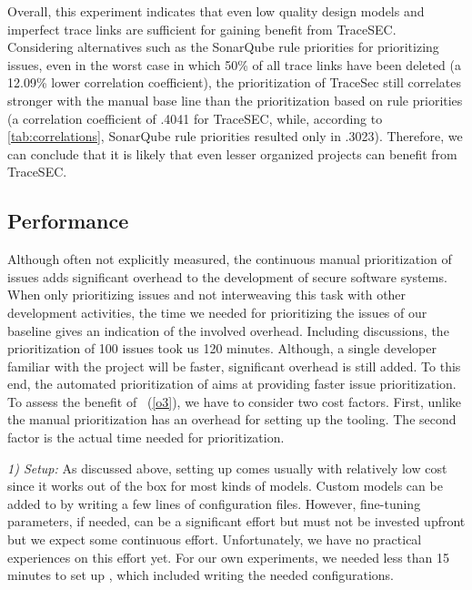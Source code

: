 Overall, this experiment indicates that even low quality design models and imperfect trace links are sufficient for gaining benefit from TraceSEC.
Considering alternatives such as the SonarQube rule priorities for prioritizing issues, even in the worst case in which 50\% of all trace links have been deleted (a 12.09\% lower correlation coefficient), the prioritization of TraceSec still correlates stronger with the manual base line than the prioritization based on rule priorities (a correlation coefficient of .4041 for TraceSEC, while, according to \autoref{tab:correlations}, SonarQube rule priorities resulted only in .3023).
Therefore, we can conclude that it is likely that even lesser organized projects can benefit from TraceSEC.

\subsection{Performance}
%
	Although often not explicitly measured, the continuous manual prioritization of issues adds significant overhead to the development of secure software systems.
	When only prioritizing issues and not interweaving this task with other development activities, the time we needed for prioritizing the issues of our baseline gives an indication of the involved overhead.
	Including discussions, the prioritization of 100 issues took us 120 minutes.
	Although, a single developer familiar with the project will be faster, significant overhead is still added.
	To this end, the automated prioritization of \appr{} aims at providing faster issue prioritization.
	To assess the benefit of \appr{}~(\ref{o3}), we have to consider two cost factors.
	First, unlike the manual prioritization \appr{} has an overhead for setting up the tooling.
	The second factor is the actual time needed for prioritization.




	\textit{1) Setup:}
	As discussed above, setting up \appr{} comes usually with relatively low cost since it works out of the box for most kinds of models.
	Custom models can be added to \appr{} by writing a few lines of configuration files.
	However, fine-tuning parameters, if needed, can be a significant effort but must not be invested upfront but we expect some continuous effort.
	Unfortunately, we have no practical experiences on this effort yet.
	For our own experiments, we needed less than 15 minutes to set up \appr{}, which included writing the needed configurations.


